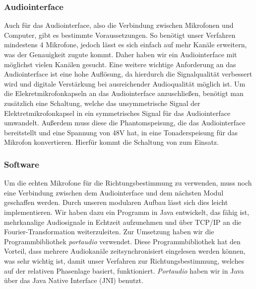 \subsubsection{Audiointerface}
Auch für das Audiointerface, also die Verbindung zwischen Mikrofonen und Computer, gibt es bestimmte Voraussetzungen. So benötigt unser Verfahren mindestens 4 Mikrofone, jedoch lässt es sich einfach auf mehr Kanäle erweitern, was der Genauigkeit zugute kommt. Daher haben wir ein Audiointerface mit möglichst vielen Kanälen gesucht. Eine weitere wichtige Anforderung an das Audiointerface ist eine hohe Auflösung, da hierdurch die Signalqualität verbessert wird und digitale Verstärkung bei ausreichender Audioqualität möglich ist. Um die Elekretmikrofonkapseln an das Audiointerface anzuschließen, benötigt man zusätzlich eine Schaltung, welche das unsymmetrische Signal der Elektretmikrofonkapsel in ein symmetrisches Signal für das Audiointerface umwandelt. Außerdem muss diese die Phantomspeisung, die das Audiointerface bereitstellt und eine Spannung von 48V hat, in eine Tonaderspeisung für das Mikrofon konvertieren. Hierfür kommt die Schaltung von \cite{Powering_microphones} zum Einsatz.

\subsubsection{Software}
Um die echten Mikrofone für die Richtungsbestimmung zu verwenden, muss noch eine Verbindung zwischen dem Audiointerface und dem nächsten Modul geschaffen werden. Durch unseren modularen Aufbau lässt sich dies leicht implementieren. Wir haben dazu ein Programm in Java entwickelt, das fähig ist, mehrkanalige Audiosignale in Echtzeit aufzunehmen und über TCP/IP an die Fourier-Transformation weiterzuleiten. Zur Umsetzung haben wir die Programmbibliothek \textit{portaudio} \cite{portaudio} verwendet. Diese Programmbibliothek hat den Vorteil, dass mehrere Audiokanäle zeitsynchronisiert eingelesen werden können, was sehr wichtig ist, damit unser Verfahren zur Richtungsbestimmung, welches auf der relativen Phasenlage basiert, funktioniert. \textit{Portaudio} haben wir in Java über das Java Native Interface (JNI) benutzt.

